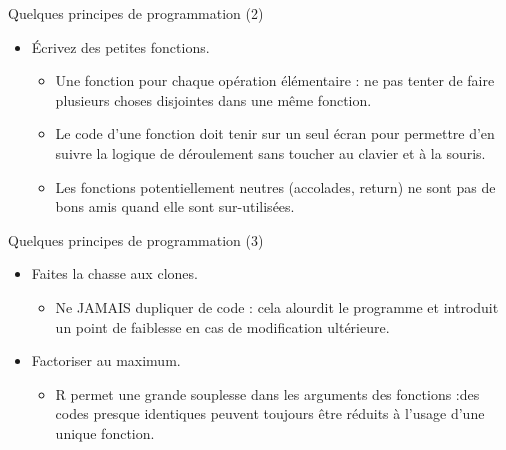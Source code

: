 \documentclass[
  ignorenonframetext,
]{beamer}
\providecommand{\tightlist}{%
  \setlength{\itemsep}{0pt}\setlength{\parskip}{0pt}}
\begin{document}
\begin{frame}{Quelques principes de programmation (2)}
\protect\hypertarget{quelques-principes-de-programmation-2}{}
\begin{itemize}
\tightlist
\item
  Écrivez des petites fonctions.

  \begin{itemize}
  \tightlist
  \item
    Une fonction pour chaque opération élémentaire : ne pas tenter de
    faire plusieurs choses disjointes dans une même fonction.
  \item
    Le code d'une fonction doit tenir sur un seul écran pour permettre
    d'en suivre la logique de déroulement sans toucher au clavier et à
    la souris.
  \item
    Les fonctions potentiellement neutres (accolades, return) ne sont
    pas de bons amis quand elle sont sur-utilisées.
  \end{itemize}
\end{itemize}
\end{frame}

\begin{frame}{Quelques principes de programmation (3)}
\protect\hypertarget{quelques-principes-de-programmation-3}{}
\begin{itemize}
\tightlist
\item
  Faites la chasse aux clones.

  \begin{itemize}
  \tightlist
  \item
    Ne JAMAIS dupliquer de code : cela alourdit le programme et
    introduit un point de faiblesse en cas de modification ultérieure.\\
  \end{itemize}
\item
  Factoriser au maximum.

  \begin{itemize}
  \tightlist
  \item
    R permet une grande souplesse dans les arguments des fonctions :des
    codes presque identiques peuvent toujours être réduits à l'usage
    d'une unique fonction.
  \end{itemize}
\end{itemize}
\end{frame}
\end{document}
